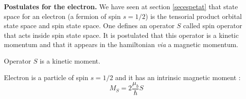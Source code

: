 \documentclass[12pt]{book}
\begin{document}
\begin{exmp}
{\bf Postulates for the electron.}
We have seen at section \ref{secespetat} that state space for an electron (a
fermion of spin $s=1/2$) is
the tensorial product orbital state space and spin state space. One defines an
operator $S$ called spin operator that acts inside spin state space. It is
postulated that this operator is a kinetic momentum and that it appears in the
hamiltonian {\it via} a magnetic momentum.
\begin{postulat}
Operator $S$ is a kinetic moment.
\end{postulat}
\begin{postulat}
Electron is a particle of spin $s=1/2$ and it has an intrinsic magnetic moment
: 
\begin{equation}
M_S=2\frac{\mu_b}{\hbar}S
\end{equation}
\end{postulat}
\end{exmp}
\end{document}
